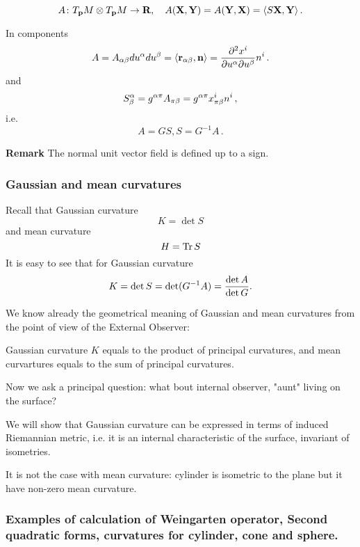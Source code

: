 \documentclass[12pt]{article}
\theoremstyle{theorem}
\numberwithin{equation}{section}
\begin{document}
       \begin{equation}\label{symmetricityofsecquadrform}
A\colon T_{\bf p} M\otimes T_{\bf p} M\to {\bf R},\quad A({\bf X},{\bf Y})=A({\bf Y},{\bf X})=\langle S{\bf X},{\bf Y}\rangle\,.
       \end{equation}

 In components
 \begin{equation}\label{compexpressforscquadrform}
    A=A_{\alpha\beta}du^\alpha du^\beta=\langle {\bf r}_{\alpha\beta}, {\bf n}\rangle={\partial^2 x^i\over \partial u^\alpha \partial u^\beta}n^i\,.
 \end{equation}
and
\begin{equation}\label{compexpressforweingarten}
    S^\alpha_\beta=g^{\alpha\pi}A_{\pi\beta}=g^{\alpha\pi}x^i_{\pi\beta}n^i\,,
     \end{equation}
i.e.
            $$
         A=GS, S=G^{-1}A\,.
            $$

 {\bf Remark} The normal unit vector field is defined up to a sign.


\subsubsection {Gaussian and mean curvatures}

   Recall that Gaussian curvature
            $$
          K=\det S
            $$
and mean curvature
           $$
         H={\rm Tr \,}S
           $$
It is easy to see that  for Gaussian curvature
           $$
         K=\det S=\det(G^{-1}A)={\det A\over \det G}.
           $$

We know already the geometrical meaning of Gaussian and mean curvatures from the point of view of the External Observer:

Gaussian curvature $K$ equals to the product of principal curvatures, and mean curvartures equals to the sum of principal curvatures.

Now we ask a principal question: what bout internal observer, "aunt" living on the surface?

We will show that Gaussian curvature can be expressed in terms of induced Riemannian metric, i.e. it is an
 internal characteristic of the surface, invariant of isometries.

  It is not the case with mean curvature: cylinder is isometric to the plane but it have
   non-zero mean curvature.

\subsubsection {Examples of calculation of Weingarten operator,
Second quadratic forms, curvatures for cylinder, cone and sphere.}
\end{document}
